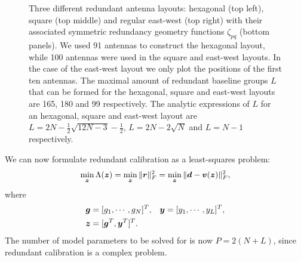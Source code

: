 \documentclass[useAMS,usenatbib]{mn2e}
\newcommand{\bz}{\bmath{z}}
\newcommand{\br}{\bmath{r}}
\newcommand{\bg}{\bmath{g}}
\newcommand{\bd}{\bmath{d}}
\newcommand{\bv}{\bmath{v}}
\newcommand{\by}{\bmath{y}}
\begin{document}
\begin{figure}
\caption{Three different redundant antenna layouts: hexagonal (top left), square (top middle) and regular east-west (top right) with their associated symmetric redundancy geometry functions $\zeta_{pq}$ (bottom panels). We used 91 antennas to construct the hexagonal layout, while 100 antennas were used in the square and east-west layouts. In the case of the east-west layout we only plot the positions of the first ten antennas. The maximal amount of redundant baseline groups $L$ that can be formed for 
the hexagonal, square and east-west layouts are 165, 180 and 99 respectively. The analytic expressions of $L$ for an hexagonal, square and east-west layout are $L = 2N-\frac{1}{2}\sqrt{12N-3}-\frac{1}{2}$,
$L=2N-2\sqrt{N}$ and $L=N-1$ respectively.\label{fig:geometry_function}}
\end{figure}

We can now formulate redundant calibration as a least-squares problem:
\begin{equation}
\label{eq:least_squares_red}
\min_{\bz} \Lambda(\bz) = \min_{\bz} \|\br\|_F^2 = \min_{\bz} \|\bd - \bv(\bz)\|_F^2, 
\end{equation}
where
\begin{align}
 \bg &=[g_1,\cdots,g_N]^T, & \by &= [y_1,\cdots,y_L]^T,\nonumber\\
 \bz &= [\bg^T,\by^T]^T. &  &\label{eq:parm_definitions}
 \end{align}
The number of model parameters to be solved for is now $P = 2(N+L)$, since redundant calibration is a complex problem.
\end{document}
